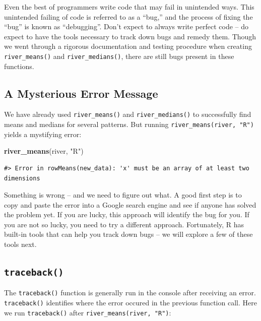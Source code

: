 \documentclass[
]{book}
\newenvironment{Shaded}{\begin{snugshade}}{\end{snugshade}}
\newcommand{\KeywordTok}[1]{\textcolor[rgb]{0.13,0.29,0.53}{\textbf{#1}}}
\newcommand{\NormalTok}[1]{#1}
\newcommand{\StringTok}[1]{\textcolor[rgb]{0.31,0.60,0.02}{#1}}
\begin{document}
Even the best of programmers write code that may fail in unintended ways. This unintended failing of code is referred to as a ``bug,'' and the process of fixing the ``bug'' is known as ``debugging''. Don't expect to always write perfect code -- do expect to have the tools necessary to track down bugs and remedy them. Though we went through a rigorous documentation and testing procedure when creating \texttt{river\_means()} and \texttt{river\_medians()}, there are still bugs present in these functions.

\hypertarget{error-onematch}{%
\subsection{A Mysterious Error Message}\label{error-onematch}}

We have already used \texttt{river\_means()} and \texttt{river\_medians()} to successfully find means and medians for several patterns. But running \texttt{river\_means(river,\ "R")} yields a mystifying error:

\begin{Shaded}
\begin{Highlighting}[]
\KeywordTok{river_means}\NormalTok{(river, }\StringTok{"R"}\NormalTok{)}
\end{Highlighting}
\end{Shaded}

\begin{verbatim}
#> Error in rowMeans(new_data): 'x' must be an array of at least two dimensions
\end{verbatim}

Something is wrong -- and we need to figure out what. A good first step is to copy and paste the error into a Google search engine and see if anyone has solved the problem yet. If you are lucky, this approach will identify the bug for you. If you are not so lucky, you need to try a different approach. Fortunately, R has built-in tools that can help you track down bugs -- we will explore a few of these tools next.

\hypertarget{traceback}{%
\subsection{\texorpdfstring{\texttt{traceback()}}{traceback()}}\label{traceback}}

The \texttt{traceback()} function is generally run in the console after receiving an error. \texttt{traceback()} identifies where the error occured in the previous function call. Here we run \texttt{traceback()} after \texttt{river\_means(river,\ "R")}:
\end{document}

